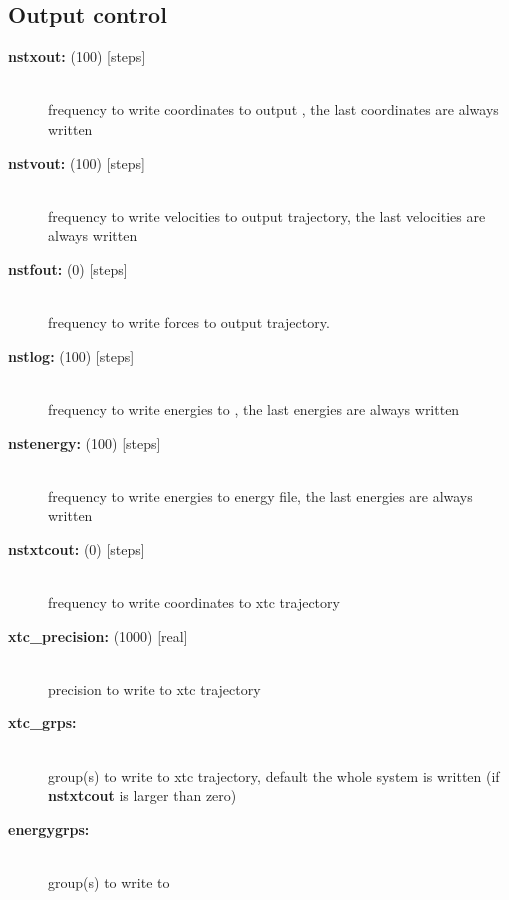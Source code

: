 \subsection{Output control}
\begin{description}
\item[{\bf nstxout: }(100) {[steps]}]\mbox{}\\
frequency to write coordinates to output 
, the last coordinates are always written
\item[{\bf nstvout: }(100) {[steps]}]\mbox{}\\
frequency  to write velocities to output trajectory,
the last velocities are always written
\item[{\bf nstfout: }(0) {[steps]}]\mbox{}\\
frequency to write forces to output trajectory.
\item[{\bf nstlog: }(100) {[steps]}]\mbox{}\\
frequency to write energies to ,
the last energies are always written
\item[{\bf nstenergy: }(100) {[steps]}]\mbox{}\\
frequency to write energies to energy file,
the last energies are always written
\item[{\bf nstxtcout: }(0) {[steps]}]\mbox{}\\
frequency to write coordinates to xtc trajectory
\item[{\bf xtc\_precision: }(1000) {[real]}]\mbox{}\\
precision to write to xtc trajectory
\item[{\bf xtc\_grps:}]\mbox{}\\
group(s) to write to xtc trajectory, default the whole system is written
(if {\bf nstxtcout} is larger than zero)  
\item[{\bf energygrps:}]\mbox{}\\
group(s) to write to 
\end{description}

